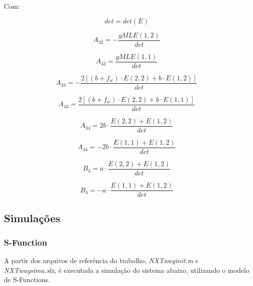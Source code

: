 \documentclass[12pt]{article}
\begin{document}
Com:

\begin{equation}
    det = det(E)
\end{equation}

\begin{equation}
    A_{32} = -\frac{gMLE(1,2)}{det}
\end{equation}

\begin{equation}
    A_{42} = \frac{gMLE(1,1)}{det}
\end{equation}

\begin{equation}
    A_{33} = - \frac{2[(b + f_w) \cdot E(2,2) + b \cdot E(1,2)]}{det}
\end{equation}

\begin{equation}
     A_{43} = \frac{2[(b + f_w) \cdot E(2,2) + b \cdot E(1,1)]}{det}
\end{equation}

\begin{equation}
     A_{34} = 2 b\cdot \frac{E(2,2) + E(1,2)}{det}
\end{equation}

\begin{equation}
     A_{44} = -2 b \cdot \frac{E(1,1) + E(1,2)}{det}
\end{equation}

\begin{equation}
     B_{3} =  a \cdot \frac{E(2,2) + E(1,2)}{det}
\end{equation}

\begin{equation}
     B_{4} = -a \cdot \frac{E(1,1) + E(1,2)}{det}
\end{equation}


\subsection{Simulações}

\subsubsection{S-Function}

\quad A partir dos arquivos de referência do trabalho, \emph{NXTway\underline{\hspace{.1in}}init.m} e \emph{NXTway\underline{\hspace{.1in}}simu.slx}, é  executada a simulação do sistema abaixo, utilizando o modelo de S-Functions.
\end{document}
